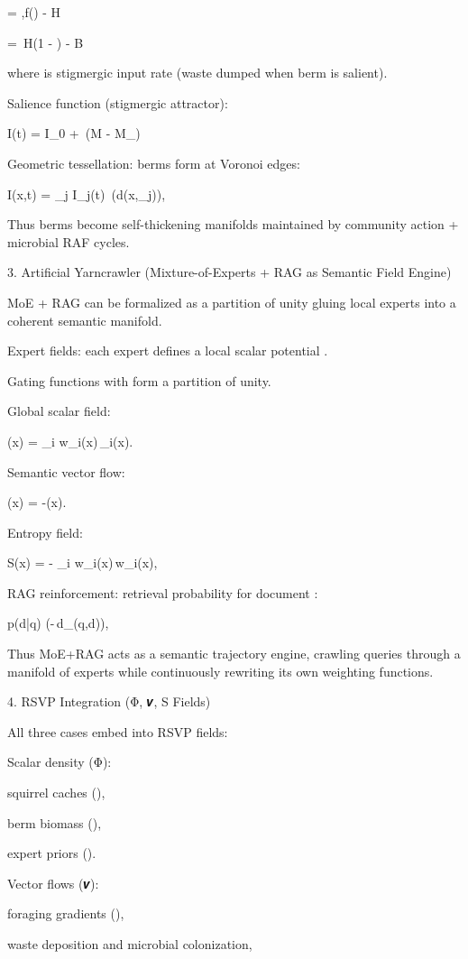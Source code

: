 \documentclass{article}
\begin{document}
 = \beta,f() - \mu H 

 = \gamma\,H(1 - ) - \nu B

where  is stigmergic input rate (waste dumped when berm is salient).

Salience function (stigmergic attractor):


I(t) = I_0 + \rho\,\sigma(M - M_{})

Geometric tessellation: berms form at Voronoi edges:


I(x,t) = \sum_j I_j(t)\, \delta(d(x,\Gamma_j)),

Thus berms become self-thickening manifolds maintained by community action + microbial RAF cycles.

3. Artificial Yarncrawler (Mixture-of-Experts + RAG as Semantic Field Engine)

MoE + RAG can be formalized as a partition of unity gluing local experts into a coherent semantic manifold.

Expert fields: each expert  defines a local scalar potential .

Gating functions  with  form a partition of unity.

Global scalar field:


\Phi(x) = \sum_i w_i(x)\,\phi_i(x).

Semantic vector flow:


(x) = -\nabla \Phi(x).

Entropy field:


S(x) = - \sum_i w_i(x)\,\log w_i(x),

RAG reinforcement: retrieval probability for document :


p(d|q) \propto \exp(-\beta\,d_{}(q,d)),

Thus MoE+RAG acts as a semantic trajectory engine, crawling queries through a manifold of experts while continuously rewriting its own weighting functions.

4. RSVP Integration (Φ, 𝒗, S Fields)

All three cases embed into RSVP fields:

Scalar density (Φ):

squirrel caches (),

berm biomass (),

expert priors ().

Vector flows (𝒗):

foraging gradients (),

waste deposition and microbial colonization,
\end{document}
